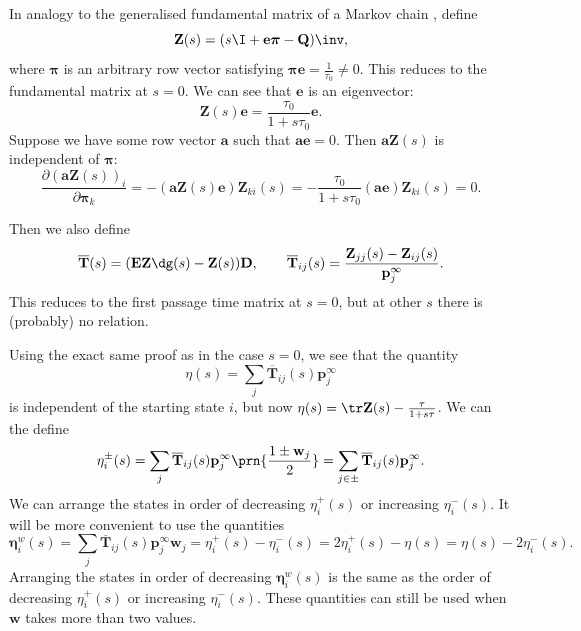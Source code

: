\documentclass[12pt]{article}
\newcommand{\onev}{\mathbf{e}}
\newcommand{\onem}{\mathbf{E}}
\newcommand{\MM}{\mathbf{Q}}
\newcommand{\pr}{\mathbf{p}}
\newcommand{\eq}{\pr^\infty}
\newcommand{\fpt}{\mathbf{T}}
\newcommand{\fptb}{\overline{\fpt}}
\newcommand{\fund}{\mathbf{Z}}
\newcommand{\D}{\mathbf{D}}
\newcommand{\pib}{\boldsymbol{\pi}}
\newcommand{\etw}{\boldsymbol{\eta}^w}
\newcommand{\w}{\mathbf{w}}
\renewcommand{\pdiff}[2]{\frac{\partial #1}{\partial #2}}
\begin{document}
In analogy to the generalised fundamental matrix of a Markov chain \cite{Kemeny1981fund}, define
%
\begin{equation}\label{eq:lfund}
  \fund(s) = (s\I +\onev\pib -\MM)\inv,
\end{equation}
%
where $\pib$ is an arbitrary row vector satisfying $\pib\onev = \frac{1}{\tau_0} \neq 0$.
This reduces to the fundamental matrix at $s=0$.
We can see that $\onev$ is an eigenvector:
%
\begin{equation}\label{eq:lfundrowsum}
  \fund(s)\onev = \frac{\tau_0}{1+s\tau_0}\onev.
\end{equation}
%
Suppose we have some row vector $\mathbf{a}$ such that $\mathbf{a}\onev=0$.
Then $\mathbf{a}\fund(s)$ is independent of $\pib$:
%
\begin{equation}\label{eq:alfund}
  \pdiff{(\mathbf{a}\fund(s))_i}{\pib_k} = -(\mathbf{a}\fund(s)\onev) \fund_{ki}(s)
      = -\frac{\tau_0}{1+s\tau_0} (\mathbf{a}\onev) \fund_{ki}(s) = 0.
\end{equation}
%


Then we also define
%
\begin{equation}\label{eq:lfptb}
  \fptb(s) = (\onem\fund\dg(s)-\fund(s))\D,
  \qquad
  \fptb_{ij}(s) = \frac{\fund_{jj}(s)-\fund_{ij}(s)}{\eq_j}.
\end{equation}
%
This reduces to the first passage time matrix at $s=0$, but at other $s$ there is (probably) no relation.

Using the exact same proof as in the case $s=0$, we see that the quantity
%
\begin{equation}\label{eq:lkemeny}
  \eta(s) = \sum_j \fptb_{ij}(s)\eq_j
\end{equation}
%
is independent of the starting state $i$, but now $\eta(s) = \tr\fund(s) - \frac{\tau}{1+s\tau}$.
We can the define
%
\begin{equation}\label{eq:lpmixtime}
  \eta^{\pm}_i(s) = \sum_j \fptb_{ij}(s)\eq_j \prn{\frac{1\pm\w_j}{2}} =  \sum_{j\in\pm} \fptb_{ij}(s)\eq_j.
\end{equation}
%
We can arrange the states in order of decreasing $\eta^{+}_i(s)$ or increasing $\eta^{-}_i(s)$.
It will be more convenient to use the quantities
%
\begin{equation}\label{eq:lwpmixtime}
  \etw_i(s) = \sum_j \fptb_{ij}(s)\eq_j \w_j
    = \eta^+_i(s) - \eta^-_i(s) =2\eta^+_i(s) - \eta(s) =\eta(s) - 2\eta^-_i(s) .
\end{equation}
%
Arranging the states in order of decreasing $\etw_i(s)$ is the same as the order of decreasing $\eta^{+}_i(s)$ or increasing $\eta^{-}_i(s)$.
These quantities can still be used when $\w$ takes more than two values.
\end{document}
